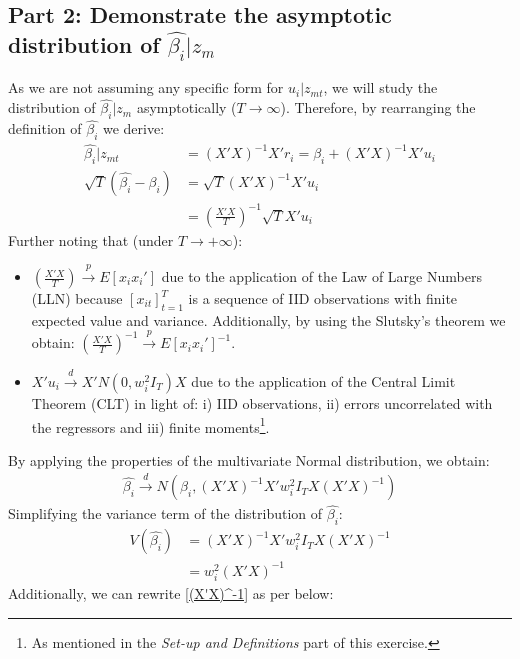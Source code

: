 \documentclass[12pt]{article}
\begin{document}
\subsection{Part 2: Demonstrate the asymptotic distribution of $\hat{\beta_i}|z_m$}
As we are not assuming any specific form for $u_i|z_{mt}$, we will study the distribution of $\hat{\beta_i}|z_m$ asymptotically ($T \to \infty$). Therefore, by rearranging the definition of $\hat{\beta_i}$ we derive:  
\begin{align*}
\hat{\beta_i} | z_{mt} &= (X'X)^{-1}X'r_i = \beta_i + (X'X)^{-1}X'u_i \\
\sqrt{T}(\hat{\beta_i} -\beta_i) &= \sqrt{T}(X'X)^{-1}X'u_i \\
&= (\frac{X'X}{T})^{-1}\sqrt{T}X'u_i 
\end{align*}
Further noting that (under $T \to +\infty$):
\begin{itemize}
\item $(\frac{X'X}{T}) \overset{p}{\to} E[x_ix_i']$ due to the application of the Law of Large Numbers (LLN) because $[x_{it}]_{t=1}^T$ is a sequence of IID observations with finite expected value and variance. Additionally, by using the Slutsky's theorem we obtain: $(\frac{X'X}{T})^{-1} \overset{p}{\to} E[x_ix_i']^{-1}$. 	
\item $X'u_i \overset{d}{\to} X'N(0,w_i^2I_T)X$ due to the application of the Central Limit Theorem (CLT) in light of: i) IID observations, ii) errors uncorrelated with the regressors and iii) finite moments\footnote{As mentioned in the \textit{Set-up and Definitions} part of this exercise.}.
\end{itemize}
By applying the properties of the multivariate Normal distribution, we obtain:
\begin{align*}
\hat{\beta_i} \overset{d}{\to} N(\beta_i, (X'X)^{-1}X'w_i^2I_TX(X'X)^{-1})
\end{align*}
Simplifying the variance term of the distribution of $\hat{\beta_i}$:
\begin{align*}
V(\hat{\beta_i}) &= (X'X)^{-1}X'w_i^2I_TX(X'X)^{-1} \\
&= w_i^2 (X'X)^{-1}
\end{align*}
Additionally, we can rewrite \ref{(X'X)^-1} as per below:
\end{document}
